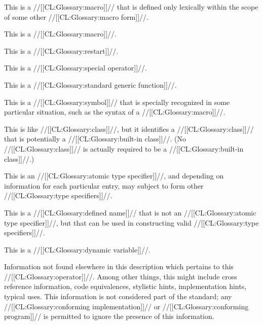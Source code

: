 
This is a //[[CL:Glossary:macro]]// that is defined only lexically within the scope of some other //[[CL:Glossary:macro form]]//.


This is a //[[CL:Glossary:macro]]//.


This is a //[[CL:Glossary:restart]]//.


This is a //[[CL:Glossary:special operator]]//.


This is a //[[CL:Glossary:standard generic function]]//.


This is a //[[CL:Glossary:symbol]]// that is specially recognized in some particular situation, such as the syntax of a //[[CL:Glossary:macro]]//.


This is like //[[CL:Glossary:class]]//, but it identifies a //[[CL:Glossary:class]]// that is potentially a //[[CL:Glossary:built-in class]]//.  (No //[[CL:Glossary:class]]// is actually required to be a //[[CL:Glossary:built-in class]]//.)


This is an //[[CL:Glossary:atomic type specifier]]//, and depending on information for each particular entry, may subject to form other //[[CL:Glossary:type specifiers]]//.


This is a //[[CL:Glossary:defined name]]// that is not an //[[CL:Glossary:atomic type specifier]]//, but that can be used in constructing valid //[[CL:Glossary:type specifiers]]//.


This is a //[[CL:Glossary:dynamic variable]]//.

\endlist

\endsubsubsection%


Information not found elsewhere in this description which pertains to this //[[CL:Glossary:operator]]//. Among other things, this might include 
 cross reference information,
 code equivalences, 
 stylistic hints,
 implementation hints,
 typical uses. This information is not considered part of the standard; any //[[CL:Glossary:conforming implementation]]// or //[[CL:Glossary:conforming program]]// is permitted to ignore the presence of this information.

